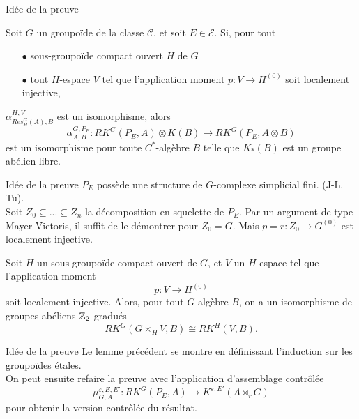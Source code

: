 \begin{frame}{Idée de la preuve}
\begin{thmfr}
Soit $G$ un groupoïde de la classe $\mathcal C$, et soit $E\in\mathcal E$. Si, pour tout 
\begin{itemize}
\item[$\bullet$] sous-groupoïde compact ouvert $H$ de $G$
\item[$\bullet$] tout $H$-espace $V$ tel que l'application moment $p : V\rightarrow H^{(0)}$ soit localement injective,
\end{itemize} 
$\alpha_{Res_H^G(A),B}^{H,V}$ est un isomorphisme, alors 
\[\alpha_{A,B}^{G,P_E}: RK^G(P_E,A)\otimes K(B)\rightarrow RK^G(P_E,A\otimes B) \] 
est un isomorphisme pour toute $C^*$-algèbre $B$ telle que $K_*(B)$ est un groupe abélien libre.\\
\end{thmfr}
\end{frame}

\begin{frame}{Idée de la preuve}
$P_E$ possède une structure de $G$-complexe simplicial fini. (J-L. Tu).\\
\vspace{0.3 cm}
Soit $Z_0 \subseteq ...\subseteq Z_n$ la décomposition en squelette de $P_E$. Par un argument de type Mayer-Vietoris, il suffit de le démontrer pour $Z_0 = G$. Mais $p =r : Z_0 \rightarrow G^{(0)} $ est localement injective. \\
\vspace{0.3 cm}
\begin{lemfr}
Soit $H$ un sous-groupoïde compact ouvert de $G$, et $V$ un $H$-espace tel que l'application moment 
\[p: V\rightarrow H^{(0)}\] 
soit localement injective. Alors, pour tout $G$-algèbre $B$, on a un isomorphisme de groupes abéliens $\mathbb Z_2$-gradués
\[RK^G(G\times_H V,B)\cong RK^H(V,B).\]
\end{lemfr}
\end{frame}

\begin{frame}{Idée de la preuve}
Le lemme précédent se montre en définissant l'induction sur les groupoïdes étales.\\
\vspace{0.3 cm}
On peut ensuite refaire la preuve avec l'application d'assemblage contrôlée
\[\mu_{G,A}^{\varepsilon, E,E'} : RK^G(P_E,A)\rightarrow K^{\varepsilon,E'}(A\rtimes_r G)\]
pour obtenir la version contrôlée du résultat.
\end{frame}

